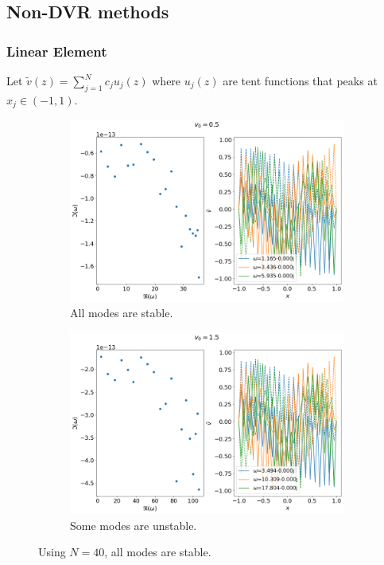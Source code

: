 \documentclass{article}
\begin{document}
\subsection{Non-DVR methods}
\subsubsection{Linear Element}
Let $ \tilde{v}(z) = \sum_{j=1}^{N} c_ju_j(z) $ where $u_j(z)$ are tent functions that peaks at $x_j\in(-1,1)$.
\begin{figure}[H]
    \centering
    \begin{subfigure}[b]{0.45\linewidth}
        \includegraphics[width=\linewidth]{img/results-linear-N=40,v0=0.5.png}
        \caption{All modes are stable.}
    \end{subfigure}%
    \begin{subfigure}[b]{0.45\linewidth}
        \includegraphics[width=\linewidth]{img/results-linear-N=40,v0=1.5.png}
        \caption{Some modes are unstable.}
    \end{subfigure}
    \caption{Using $N=40$, all modes are stable.}
    \label{fig:results-linear}
\end{figure}
\end{document}
